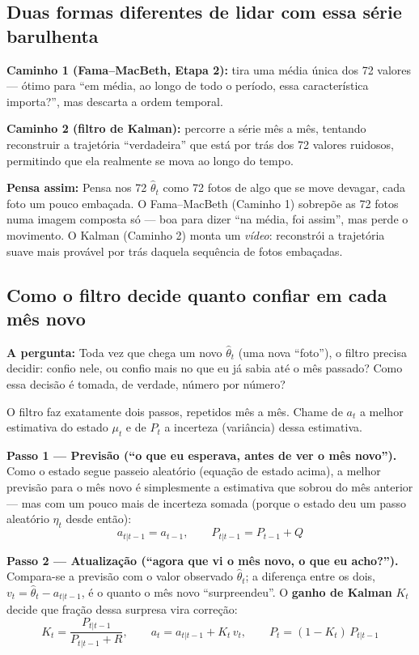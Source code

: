 \documentclass[11pt,a4paper]{article}
\newcommand{\pergunta}[1]{\par\vspace{4pt}\noindent\textbf{\color{azul}A pergunta:} #1\par\vspace{2pt}}
\newcommand{\analogia}[1]{\par\vspace{4pt}\noindent\textbf{\color{verde}Pensa assim:} #1\par\vspace{2pt}}
\begin{document}
\subsection{Duas formas diferentes de lidar com essa série barulhenta}

\textbf{Caminho 1 (Fama--MacBeth, Etapa 2):} tira uma média única dos 72 valores --- ótimo para
``em média, ao longo de todo o período, essa característica importa?'', mas descarta a ordem
temporal.

\textbf{Caminho 2 (filtro de Kalman):} percorre a série mês a mês, tentando reconstruir a
trajetória ``verdadeira'' que está por trás dos 72 valores ruidosos, permitindo que ela realmente
se mova ao longo do tempo.

\analogia{Pensa nos 72 $\widehat\theta_t$ como 72 fotos de algo que se move devagar, cada foto um
pouco embaçada. O Fama--MacBeth (Caminho 1) sobrepõe as 72 fotos numa imagem composta só --- boa
para dizer ``na média, foi assim'', mas perde o movimento. O Kalman (Caminho 2) monta um
\emph{vídeo}: reconstrói a trajetória suave mais provável por trás daquela sequência de fotos
embaçadas.}

\subsection{Como o filtro decide quanto confiar em cada mês novo}

\pergunta{Toda vez que chega um novo $\widehat\theta_t$ (uma nova ``foto''), o filtro precisa
decidir: confio nele, ou confio mais no que eu já sabia até o mês passado? Como essa decisão é
tomada, de verdade, número por número?}

O filtro faz exatamente dois passos, repetidos mês a mês. Chame de $a_{t}$ a melhor estimativa do
estado $\mu_t$ e de $P_t$ a incerteza (variância) dessa estimativa.

\textbf{Passo 1 --- Previsão (``o que eu esperava, antes de ver o mês novo'').} Como o estado
segue passeio aleatório (equação de estado acima), a melhor previsão para o mês novo é
simplesmente a estimativa que sobrou do mês anterior --- mas com um pouco mais de incerteza
somada (porque o estado deu um passo aleatório $\eta_t$ desde então):
$$a_{t|t-1} = a_{t-1}, \qquad P_{t|t-1} = P_{t-1} + Q$$

\textbf{Passo 2 --- Atualização (``agora que vi o mês novo, o que eu acho?'').} Compara-se a
previsão com o valor observado $\widehat\theta_t$; a diferença entre os dois, $v_t =
\widehat\theta_t - a_{t|t-1}$, é o quanto o mês novo ``surpreendeu''. O \textbf{ganho de Kalman}
$K_t$ decide que fração dessa surpresa vira correção:
$$K_t = \frac{P_{t|t-1}}{P_{t|t-1}+R}, \qquad
a_{t} = a_{t|t-1} + K_t\, v_t, \qquad
P_{t} = (1-K_t)\,P_{t|t-1}$$
\end{document}
